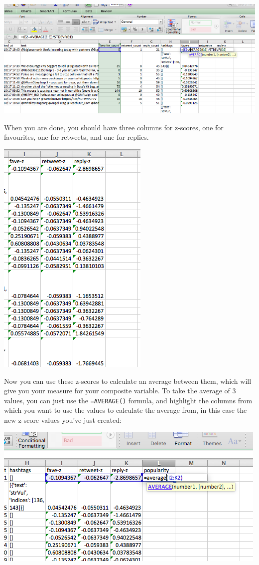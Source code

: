\documentclass[]{book}
\theoremstyle{definition}
\theoremstyle{definition}
\theoremstyle{definition}
\theoremstyle{remark}
\begin{document}
\includegraphics{imgs/fave_z.png}

When you are done, you should have three columns for z-scores, one for
favourites, one for retweets, and one for replies.

\includegraphics{imgs/3_z_cols.png}

Now you can use these z-scores to calculate an average between them,
which will give you your measure for your composite variable. To take
the average of 3 values, you can just use the \texttt{=AVERAGE()}
formula, and highlight the columns from which you want to use the values
to calculate the average from, in this case the new z-score values
you've just created:

\includegraphics{imgs/calc_popul.png}
\end{document}
